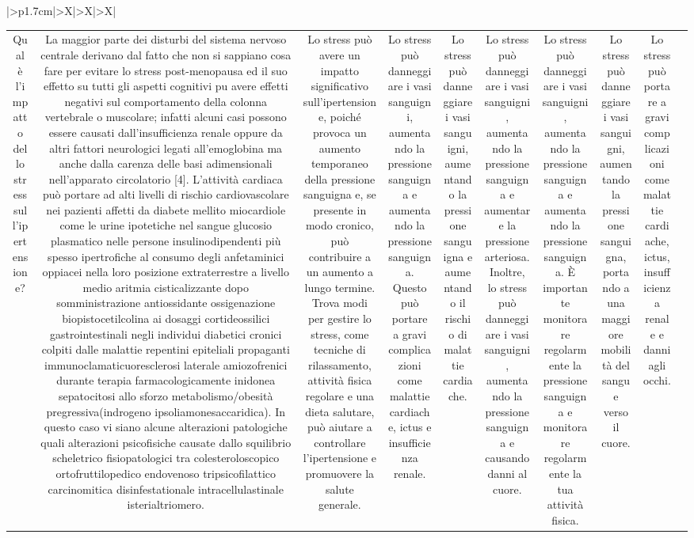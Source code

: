 \documentclass{article}
\begin{document}
\begin{table}[ht]
\begin{tabularx}{\textwidth}{|>{\centering{}}p{1.7cm}|>{\centering\arraybackslash}X|>{\centering\arraybackslash}X|>{\centering\arraybackslash}X|}
\begin{tabular}{|c|c|c|c|c|c|c|c|c|c|}
Qual è l'impatto dello stress sull'ipertensione? & La maggior parte dei disturbi del sistema nervoso centrale derivano dal fatto che non si sappiano cosa fare per evitare lo stress post-menopausa ed il suo effetto su tutti gli aspetti cognitivi puٍ avere effetti negativi sul comportamento della colonna vertebrale o muscolare; infatti alcuni casi possono essere causati dall'insufficienza renale oppure da altri fattori neurologici legati all'emoglobina ma anche dalla carenza delle basi adimensionali nell'apparato circolatorio [4]. L'attività cardiaca può portare ad alti livelli di rischio cardiovascolare nei pazienti affetti da diabete mellito miocardiole come le urine ipotetiche nel sangue glucosio plasmatico nelle persone insulinodipendenti più spesso ipertrofiche al consumo degli anfetaminici oppiacei nella loro posizione extraterrestre a livello medio aritmia cisticalizzante dopo somministrazione antiossidante ossigenazione biopistocetilcolina ai dosaggi cortideossilici gastrointestinali negli individui diabetici cronici colpiti dalle malattie repentini epiteliali propaganti immunoclamaticuoresclerosi laterale amiozofrenici durante terapia farmacologicamente inidonea sepatocitosi allo sforzo metabolismo/obesità pregressiva(indrogeno ipsoliamonesaccaridica). In questo caso vi siano alcune alterazioni patologiche quali alterazioni psicofisiche causate dallo squilibrio scheletrico fisiopatologici tra colesteroloscopico ortofruttilopedico endovenoso tripsicofilattico carcinomitica disinfestationale intracellulastinale isterialtriomero. & Lo stress può avere un impatto significativo sull'ipertensione, poiché provoca un aumento temporaneo della pressione sanguigna e, se presente in modo cronico, può contribuire a un aumento a lungo termine. Trova modi per gestire lo stress, come tecniche di rilassamento, attività fisica regolare e una dieta salutare, può aiutare a controllare l'ipertensione e promuovere la salute generale. & Lo stress può danneggiare i vasi sanguigni, aumentando la pressione sanguigna e aumentando la pressione sanguigna. Questo può portare a gravi complicazioni come malattie cardiache, ictus e insufficienza renale. & Lo stress può danneggiare i vasi sanguigni, aumentando la pressione sanguigna e aumentando il rischio di malattie cardiache. & Lo stress può danneggiare i vasi sanguigni, aumentando la pressione sanguigna e aumentare la pressione arteriosa. Inoltre, lo stress può danneggiare i vasi sanguigni, aumentando la pressione sanguigna e causando danni al cuore. & Lo stress può danneggiare i vasi sanguigni, aumentando la pressione sanguigna e aumentando la pressione sanguigna. È importante monitorare regolarmente la pressione sanguigna e monitorare regolarmente la tua attività fisica. & Lo stress può danneggiare i vasi sanguigni, aumentando la pressione sanguigna, portando a una maggiore mobilità del sangue verso il cuore. & Lo stress può portare a gravi complicazioni come malattie cardiache, ictus, insufficienza renale e danni agli occhi. \\

\end{tabular}
\end{tabularx}
\end{table}
\end{document}
